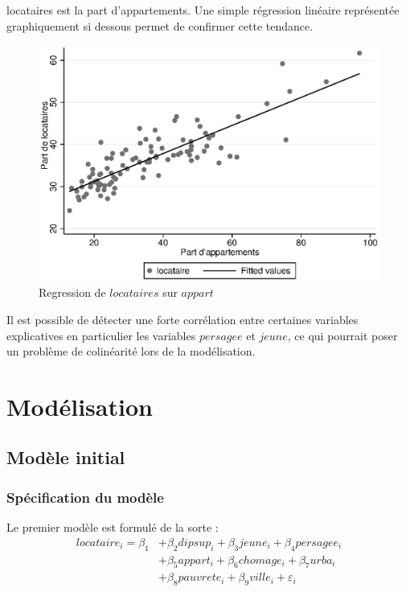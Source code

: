 \documentclass[12pt]{article}
\begin{document}
locataires est la part d'appartements. Une simple régression linéaire représentée graphiquement si dessous permet de confirmer cette tendance.
\begin{figure}[H]
    \centering
    \caption{Regression de $locataires$ sur $appart$ }
\includegraphics[scale=.6]{part_appart.eps}
\end{figure}
Il est possible de détecter une forte corrélation entre certaines variables explicatives en particulier les variables $persagee$ et $jeune$, ce qui pourrait poser un problème
de colinéarité lors de la modélisation.
\newpage
\section{Modélisation}
\subsection{Modèle initial}
\subsubsection{Spécification du modèle}
Le premier modèle est formulé de la sorte : 
\begin{equation}
\begin{split}
		locataire_i =  \beta_1 &+ \beta_2dipsup_i + \beta_3jeune_i + \beta_4persagee_i \\
						&+ \beta_5appart_i + \beta_6chomage_i + \beta_7urba_i \\
						&+ \beta_8pauvrete_i + \beta_9ville_i + \varepsilon_i 
\end{split}
\end{equation}
\end{document}
